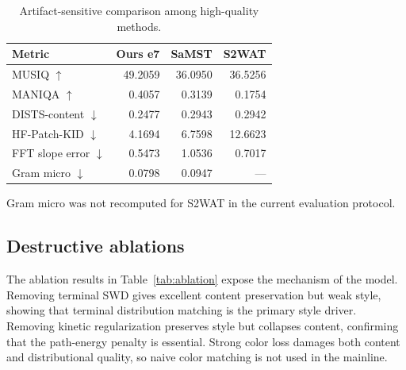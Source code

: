 ﻿\documentclass[letterpaper]{article}
\begin{document}
\begin{table}[t]
\centering
\caption{Artifact-sensitive comparison among high-quality methods.}
\label{tab:artifact}
\begin{tabular}{lrrr}
\toprule
Metric & Ours e7 & SaMST & S2WAT \\
\midrule
MUSIQ $\uparrow$ & 49.2059 & 36.0950 & 36.5256 \\
MANIQA $\uparrow$ & 0.4057 & 0.3139 & 0.1754 \\
DISTS-content $\downarrow$ & 0.2477 & 0.2943 & 0.2942 \\
HF-Patch-KID $\downarrow$ & 4.1694 & 6.7598 & 12.6623 \\
FFT slope error $\downarrow$ & 0.5473 & 1.0536 & 0.7017 \\
Gram micro $\downarrow$ & 0.0798 & 0.0947 & --- \\
\bottomrule
\end{tabular}
\smallskip
\footnoterule\small
Gram micro was not recomputed for S2WAT in the current evaluation protocol.
\end{table}

\subsection{Destructive ablations}
\begin{table}[t]
\centering
\caption{Destructive ablations under the strict-750 protocol.}
\label{tab:ablation}
\end{table}

The ablation results in Table~\ref{tab:ablation} expose the mechanism of the model. Removing terminal SWD gives excellent content preservation but weak style, showing that terminal distribution matching is the primary style driver. Removing kinetic regularization preserves style but collapses content, confirming that the path-energy penalty is essential. Strong color loss damages both content and distributional quality, so naive color matching is not used in the mainline.
\end{document}
